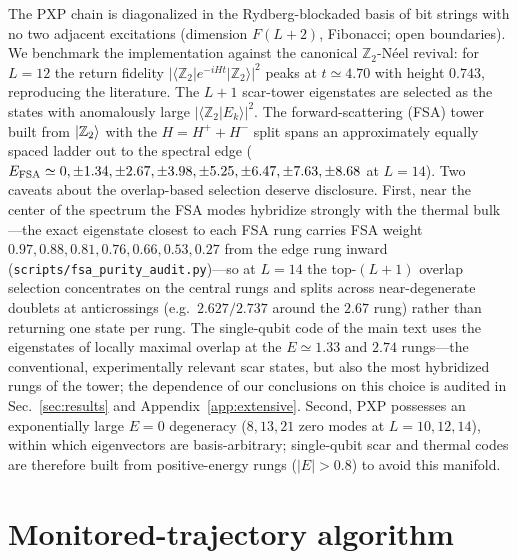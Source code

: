 \documentclass[aps,prb,twocolumn]{revtex4-2}
\newcommand{\Ztwo}{\mathbb{Z}_2}
\begin{document}
The PXP chain is diagonalized in the Rydberg-blockaded basis of bit strings with
no two adjacent excitations (dimension $F(L{+}2)$, Fibonacci; open boundaries).
We benchmark the implementation against the canonical $\Ztwo$-N\'eel revival:
for $L=12$ the return fidelity $|\langle\Ztwo|e^{-iHt}|\Ztwo\rangle|^2$ peaks at
$t\simeq4.70$ with height $0.743$, reproducing the literature. The $L{+}1$
scar-tower eigenstates are selected as the states with anomalously large
$|\langle\Ztwo|E_k\rangle|^2$. The forward-scattering (FSA) tower built from
$\ket{\Ztwo}$ with the $H=H^++H^-$ split spans an approximately equally
spaced ladder out to the spectral edge ($E_{\rm FSA}\simeq0,\pm1.34,\pm2.67,
\pm3.98,\pm5.25,\pm6.47,\pm7.63,\pm8.68$ at $L=14$). Two caveats about the
overlap-based selection deserve disclosure. First, near the center of the
spectrum the FSA modes hybridize strongly with the thermal bulk---the exact
eigenstate closest to each FSA rung carries FSA weight
$0.97,0.88,0.81,0.76,0.66,0.53,0.27$ from the edge rung inward
(\texttt{scripts/fsa\_purity\_audit.py})---so at $L=14$ the top-$(L{+}1)$
overlap selection concentrates on the central rungs and splits across
near-degenerate doublets at anticrossings (e.g.\ $2.627/2.737$ around the
$2.67$ rung) rather than returning one state per rung. The single-qubit code
of the main text uses the eigenstates of locally maximal overlap at the
$E\simeq1.33$ and $2.74$ rungs---the conventional, experimentally relevant
scar states, but also the most hybridized rungs of the tower; the dependence
of our conclusions on this choice is audited in
Sec.~\ref{sec:results} and Appendix~\ref{app:extensive}. Second, PXP
possesses an exponentially large $E=0$ degeneracy ($8,13,21$ zero modes at
$L=10,12,14$), within which eigenvectors are basis-arbitrary; single-qubit
scar and thermal codes are therefore built from positive-energy rungs
($|E|>0.8$) to avoid this manifold.

\section{Monitored-trajectory algorithm}
\label{app:algorithm}
\end{document}
